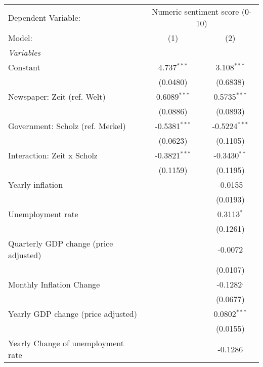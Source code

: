 
\begingroup
\centering
\begin{tabular}{lcc}
   \tabularnewline \midrule \midrule
   Dependent Variable: & \multicolumn{2}{c}{Numeric sentiment score (0-10)}\\
   Model:                                & (1)             & (2)\\  
   \midrule
   \emph{Variables}\\
   Constant                              & 4.737$^{***}$   & 3.108$^{***}$\\   
                                         & (0.0480)        & (0.6838)\\   
   Newspaper: Zeit (ref. Welt)           & 0.6089$^{***}$  & 0.5735$^{***}$\\   
                                         & (0.0886)        & (0.0893)\\   
   Government: Scholz (ref. Merkel)      & -0.5381$^{***}$ & -0.5224$^{***}$\\   
                                         & (0.0623)        & (0.1105)\\   
   Interaction: Zeit x Scholz            & -0.3821$^{***}$ & -0.3430$^{**}$\\   
                                         & (0.1159)        & (0.1195)\\   
   Yearly inflation                      &                 & -0.0155\\   
                                         &                 & (0.0193)\\   
   Unemployment rate                     &                 & 0.3113$^{*}$\\   
                                         &                 & (0.1261)\\   
   Quarterly GDP change (price adjusted) &                 & -0.0072\\   
                                         &                 & (0.0107)\\   
   Monthly Inflation Change              &                 & -0.1282$^{.}$\\   
                                         &                 & (0.0677)\\   
   Yearly GDP change (price adjusted)    &                 & 0.0802$^{***}$\\   
                                         &                 & (0.0155)\\   
   Yearly Change of unemployment rate    &                 & -0.1286\\   

\end{tabular}
